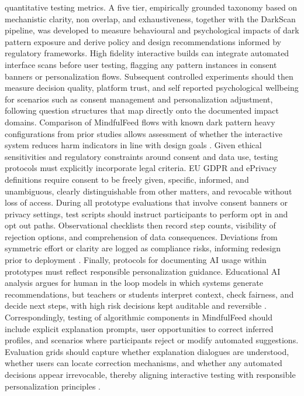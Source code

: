 \documentclass{article}
\begin{document}
quantitative testing metrics. A five tier, empirically grounded taxonomy based on mechanistic clarity, non overlap, and exhaustiveness, together with the DarkScan pipeline, was developed to measure behavioural and psychological impacts of dark pattern exposure and derive policy and design recommendations informed by regulatory frameworks. High fidelity interactive builds can integrate automated interface scans before user testing, flagging any pattern instances in consent banners or personalization flows. Subsequent controlled experiments should then measure decision quality, platform trust, and self reported psychological wellbeing for scenarios such as consent management and personalization adjustment, following question structures that map directly onto the documented impact domains. Comparison of MindfulFeed flows with known dark pattern heavy configurations from prior studies allows assessment of whether the interactive system reduces harm indicators in line with design goals \parencites[2]{4807303}. Given ethical sensitivities and regulatory constraints around consent and data use, testing protocols must explicitly incorporate legal criteria. EU GDPR and ePrivacy definitions require consent to be freely given, specific, informed, and unambiguous, clearly distinguishable from other matters, and revocable without loss of access. During all prototype evaluations that involve consent banners or privacy settings, test scripts should instruct participants to perform opt in and opt out paths. Observational checklists then record step counts, visibility of rejection options, and comprehension of data consequences. Deviations from symmetric effort or clarity are logged as compliance risks, informing redesign prior to deployment \parencites[4]{5678011}. Finally, protocols for documenting AI usage within prototypes must reflect responsible personalization guidance. Educational AI analysis argues for human in the loop models in which systems generate recommendations, but teachers or students interpret context, check fairness, and decide next steps, with high risk decisions kept auditable and reversible \parencites[5]{5375614}. Correspondingly, testing of algorithmic components in MindfulFeed should include explicit explanation prompts, user opportunities to correct inferred profiles, and scenarios where participants reject or modify automated suggestions. Evaluation grids should capture whether explanation dialogues are understood, whether users can locate correction mechanisms, and whether any automated decisions appear irrevocable, thereby aligning interactive testing with responsible personalization principles \parencites[5]{5375614}[8]{7808872}.
\end{document}
